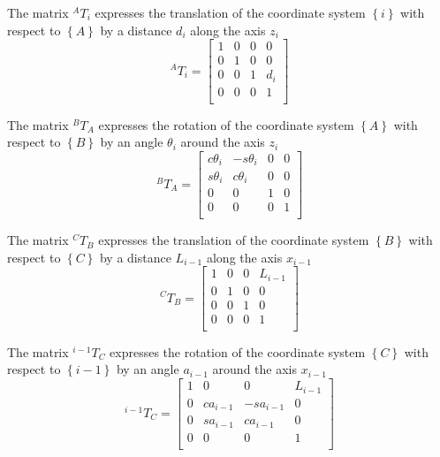 The matrix $^{A}T_i$ expresses the translation of the coordinate system $\left\lbrace i \right\rbrace$ with respect to $\left\lbrace A \right\rbrace$ by a distance $d_i$ along the axis $z_i$
\begin{equation}
^{A}T_i = 
\begin{bmatrix}
1 & 0 & 0 & 0\\
0 & 1 & 0 & 0\\
0 & 0 & 1 & d_i\\
0 & 0 & 0 & 1\\
\end{bmatrix}
\end{equation}

The matrix $^{B}T_A$ expresses the rotation of the coordinate system $\left\lbrace A \right\rbrace$ with respect to $\left\lbrace B \right\rbrace$ by an angle $θ_i$ around the axis $z_i$
\begin{equation}
^{B}T_A = 
\begin{bmatrix}
c\theta_i & -s\theta_i & 0 & 0\\
s\theta_i & c\theta_i & 0 & 0\\
0 & 0 & 1 & 0\\
0 & 0 & 0 & 1\\
\end{bmatrix}
\end{equation}

The matrix $^{C}T_B$ expresses the translation of the coordinate system $\left\lbrace B \right\rbrace$ with respect to $\left\lbrace C \right\rbrace$ by a distance $L_{i-1}$ along the axis $x_{i-1}$
\begin{equation}
^{C}T_B = 
\begin{bmatrix}
1 & 0 & 0 & L_{i-1}\\
0 & 1 & 0 & 0\\
0 & 0 & 1 & 0\\
0 & 0 & 0 & 1\\
\end{bmatrix}
\end{equation}

The matrix $^{i-1}T_C$ expresses the rotation of the coordinate system $\left\lbrace C \right\rbrace$ with respect to $\left\lbrace i-1 \right\rbrace$ by an angle $a_{i-1}$ around the axis $x_{i-1}$
\begin{equation}
^{i-1}T_C = 
\begin{bmatrix}
1 & 0 & 0 & L_{i-1}\\
0 & ca_{i-1} & -sa_{i-1} & 0\\
0 & sa_{i-1} & ca_{i-1} & 0\\
0 & 0 & 0 & 1\\
\end{bmatrix}
\end{equation}

